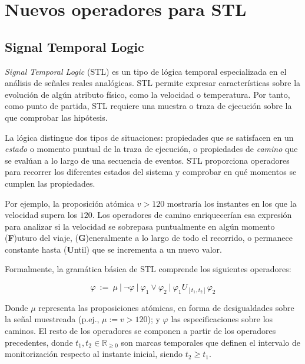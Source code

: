 \chapter{Nuevos operadores para STL}
\label{cha:stl}

\section{Signal Temporal Logic}
\textit{Signal Temporal Logic} (STL) \cite{STL} es un tipo de lógica temporal especializada en el análisis de señales reales analógicas. STL permite expresar características sobre la evolución de algún atributo físico, como la velocidad o temperatura. Por tanto, como punto de partida, STL requiere una muestra o traza de ejecución sobre la que comprobar las hipótesis.

La lógica distingue dos tipos de situaciones: propiedades que se satisfacen en un \textit{estado} o momento puntual de la traza de ejecución, o propiedades de \textit{camino} que se evalúan a lo largo de una secuencia de eventos. STL proporciona operadores para recorrer los diferentes estados del sistema y comprobar en qué momentos se cumplen las propiedades.

Por ejemplo, la proposición atómica $v > 120$ mostraría los instantes en los que la velocidad supera los $120$. Los operadores de camino enriquecerían esa expresión para analizar si la velocidad se sobrepasa puntualmente en algún momento (\textbf{F})uturo del viaje, (\textbf{G})eneralmente a lo largo de todo el recorrido, o permanece constante hasta (\textbf{U}ntil) que se incrementa a un nuevo valor. 

Formalmente, la gramática básica de STL comprende los siguientes operadores:

$$ \varphi \ := \ \mu \ |\ \neg \varphi \ |\ \varphi_{1} \lor \varphi_{2} \ |\ \varphi_{1} U_{[t_1, t_2]} \varphi_{2}$$

Donde $\mu$ representa las proposiciones atómicas, en forma de desigualdades sobre la señal muestreada (p.ej., $\mu := v > 120$); y $\varphi$ las especificaciones sobre los caminos. El resto de los operadores se componen a partir de los operadores precedentes, donde $t_1, t_2 \in \mathbb{R}_{\geq 0}$ son marcas temporales que definen el intervalo de monitorización respecto al instante inicial, siendo $t_2 \geq t_1$. 



